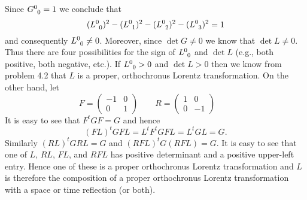 \documentclass[minion]{homework}
\begin{document}
\begin{aproblems}
Since $G\indices{^0_0}=1$ we conclude that
\begin{equation}
(L\indices{^0_0})^2 - (L\indices{^0_1})^2-(L\indices{^0_2})^2-(L\indices{^0_3})^2=1
\end{equation}
and consequently $L\indices{^0_0}\neq 0$.  Moreover, since $\det G\neq 0$ we know that $\det L\neq 0$.
Thus there are four possibilities for the sign of $L\indices{^0_0}$ and $\det L$ (e.g., both positive, both negative, etc.).  If $L\indices{^0_0}>0$ and $\det L>0$ then we know from problem
4.2 that $L$ is a proper, orthochronus Lorentz transformation. On the other hand, let 
\begin{equation}
F=\begin{pmatrix} -1 & 0\\ 0 & 1 \end{pmatrix}\qquad R=\begin{pmatrix} 1 & 0\\ 0 & -1 \end{pmatrix}\qquad 
\end{equation}
It is easy to see that $F^t G F = G$ and hence
\begin{equation}
(FL)^t G FL = L^t F^t G F L = L^t G L = G.
\end{equation}
Similarly $(RL)^t G RL=G$ and $(RFL)^t G (RFL)=G$.  It is easy to see that one of
$L$, $RL$, $FL$, and $RFL$ has positive determinant and a positive upper-left entry.
Hence one of these is a proper orthochronus Lorentz transformation and $L$ is therefore
the composition of a proper orthochronus Lorentz transformation with a space or time reflection (or both).




\end{aproblems}
\end{document}
